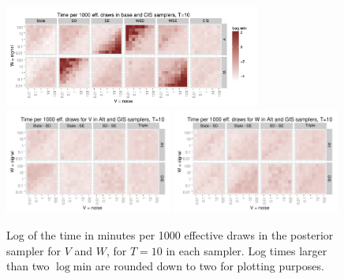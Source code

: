 \documentclass{article}
\begin{document}
\begin{figure}[!h]
\centering
\includegraphics[width=0.75\textwidth]{basecistimeplot10}
\includegraphics[width=0.49\textwidth]{altgisVtimeplot10}
\includegraphics[width=0.49\textwidth]{altgisWtimeplot10}
\caption{Log of the time in minutes per 1000 effective draws in the posterior sampler for $V$ and $W$, for $T=10$ in each sampler. Log times larger than two $\log \mathrm{min}$ are rounded down to two for plotting purposes.}
\label{baseinttimeplot1}
\end{figure}
\end{document}
